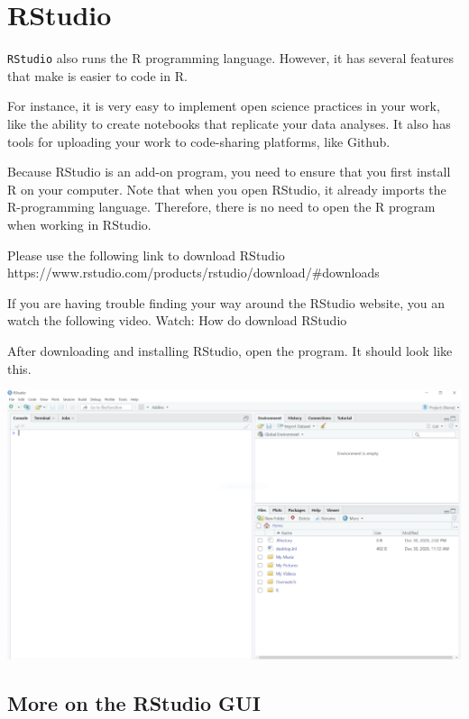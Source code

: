 \documentclass[
]{book}
\begin{document}
\hypertarget{rstudio}{%
\section{RStudio}\label{rstudio}}

\texttt{RStudio} also runs the R programming language. However, it has several features that make is easier to code in R.

For instance, it is very easy to implement open science practices in your work, like the ability to create notebooks that replicate your data analyses. It also has tools for uploading your work to code-sharing platforms, like Github.

Because RStudio is an add-on program, you need to ensure that you first install R on your computer. Note that when you open RStudio, it already imports the R-programming language. Therefore, there is no need to open the R program when working in RStudio.

Please use the following link to download RStudio
https://www.rstudio.com/products/rstudio/download/\#downloads

If you are having trouble finding your way around the RStudio website, you an watch the following video.
Watch: How do download RStudio

After downloading and installing RStudio, open the program. It should look like this.

\includegraphics[width=1\linewidth]{images-figures/02-r-studio-gui}

\hypertarget{more-on-the-rstudio-gui}{%
\subsection{More on the RStudio GUI}\label{more-on-the-rstudio-gui}}
\end{document}
